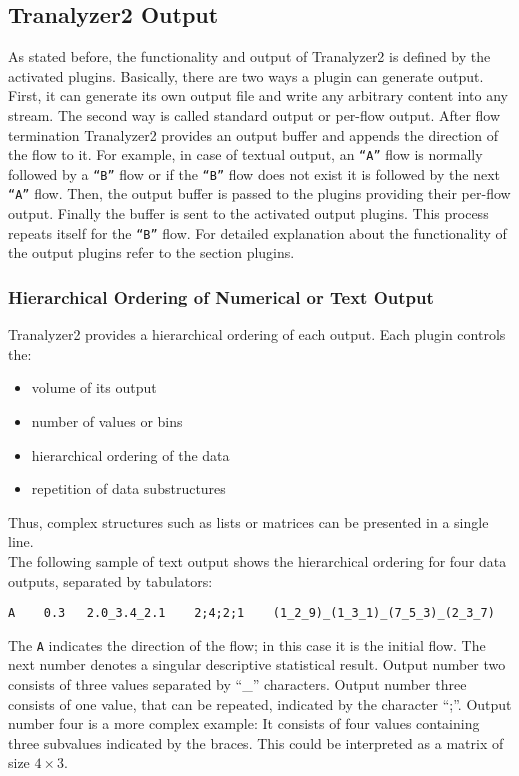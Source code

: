 \subsection{Tranalyzer2 Output}\label{tranalyzer_output}
As stated before, the functionality and output of Tranalyzer2 is defined by the activated plugins.
Basically, there are two ways a plugin can generate output.
First, it can generate its own output file and write any arbitrary content into any stream.
The second way is called standard output or per-flow output. After flow termination Tranalyzer2 provides an output buffer and appends the direction of the flow to it. For example, in case of textual output, an {\tt ``A''} flow is normally followed by a {\tt ``B''} flow or if the {\tt ``B''} flow does not exist it is followed by the next {\tt ``A''} flow. Then, the output buffer is passed to the plugins providing their per-flow output. Finally the buffer is sent to the activated output plugins. This process repeats itself for the {\tt ``B''} flow. For detailed explanation about the functionality of the output plugins refer to the section plugins.

\subsubsection{Hierarchical Ordering of Numerical or Text Output}
Tranalyzer2 provides a hierarchical ordering of each output. Each plugin controls the:
\begin{itemize}
\item volume of its output
\item number of values or bins
\item hierarchical ordering of the data
\item repetition of data substructures
\end{itemize}
Thus, complex structures such as lists or matrices can be presented in a single line.\\
The following sample of text output shows the hierarchical ordering for four data outputs, separated by tabulators:
\begin{figure*}[!ht]
\centering
\begin{lstlisting}
A    0.3   2.0_3.4_2.1    2;4;2;1    (1_2_9)_(1_3_1)_(7_5_3)_(2_3_7)
\end{lstlisting}
\end{figure*}

The {\tt A} indicates the direction of the flow; in this case it is the initial flow. The next number denotes a singular descriptive statistical result. Output number two consists of three values separated by ``\_'' characters. Output number three consists of one value, that can be repeated, indicated by the character ``;''. Output number four is a more complex example: It consists of four values containing three subvalues indicated by the braces. This could be interpreted as a matrix of size $4\times3$.

